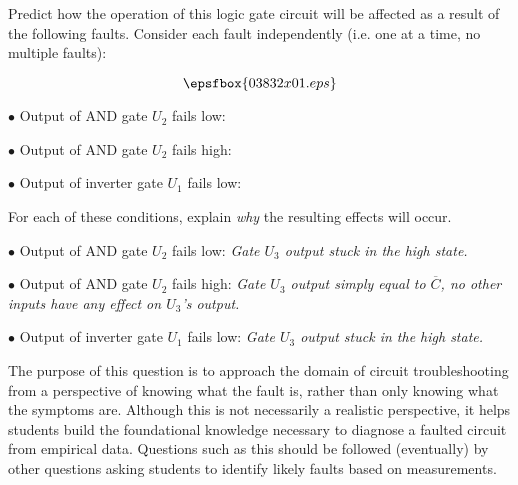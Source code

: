 

Predict how the operation of this logic gate circuit will be affected as a result of the following faults.  Consider each fault independently (i.e. one at a time, no multiple faults):

$$\epsfbox{03832x01.eps}$$

\medskip
\item{$\bullet$} Output of AND gate $U_2$ fails low:
\vskip 5pt
\item{$\bullet$} Output of AND gate $U_2$ fails high:
\vskip 5pt
\item{$\bullet$} Output of inverter gate $U_1$ fails low:
\medskip

For each of these conditions, explain {\it why} the resulting effects will occur.







\medskip
\item{$\bullet$} Output of AND gate $U_2$ fails low: {\it Gate $U_3$ output stuck in the high state.}
\vskip 5pt
\item{$\bullet$} Output of AND gate $U_2$ fails high: {\it Gate $U_3$ output simply equal to $\overline{C}$, no other inputs have any effect on $U_3$'s output.}
\vskip 5pt
\item{$\bullet$} Output of inverter gate $U_1$ fails low: {\it Gate $U_3$ output stuck in the high state.}
\medskip







The purpose of this question is to approach the domain of circuit troubleshooting from a perspective of knowing what the fault is, rather than only knowing what the symptoms are.  Although this is not necessarily a realistic perspective, it helps students build the foundational knowledge necessary to diagnose a faulted circuit from empirical data.  Questions such as this should be followed (eventually) by other questions asking students to identify likely faults based on measurements.




